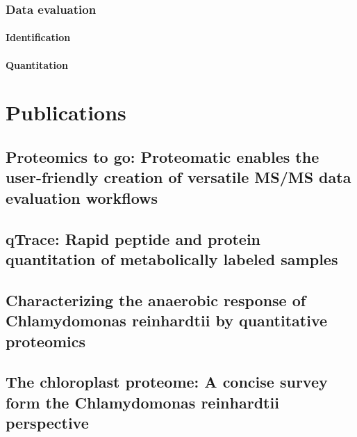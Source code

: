 \documentclass[11pt,a4paper,twoside]{report}
\begin{document}
\subsection{Data evaluation}

\subsubsection{Identification}

\subsubsection{Quantitation}

\chapter{Publications}

\section{Proteomics to go: Proteomatic enables the user-friendly creation of versatile MS/MS data evaluation workflows}

% 

\section{qTrace: Rapid peptide and protein quantitation of metabolically labeled samples}


\section{Characterizing the anaerobic response of Chlamydomonas reinhardtii by quantitative proteomics}

\section{The chloroplast proteome: A concise survey form the Chlamydomonas reinhardtii perspective}
\end{document}
